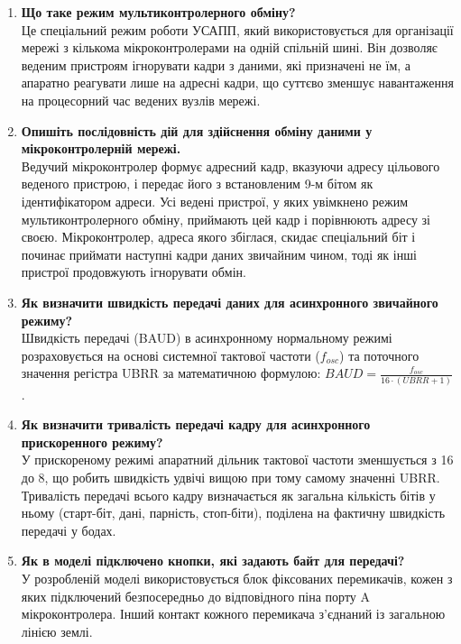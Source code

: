 \documentclass[14pt, a4paper]{extreport}
\begin{document}
\begin{enumerate}
		\item \textbf{Що таке режим мультиконтролерного обміну?} \\ Це спеціальний режим роботи УСАПП, який використовується для організації мережі з кількома мікроконтролерами на одній спільній шині. Він дозволяє веденим пристроям ігнорувати кадри з даними, які призначені не їм, а апаратно реагувати лише на адресні кадри, що суттєво зменшує навантаження на процесорний час ведених вузлів мережі.
		
		\item \textbf{Опишіть послідовність дій для здійснення обміну даними у мікроконтролерній мережі.} \\ Ведучий мікроконтролер формує адресний кадр, вказуючи адресу цільового веденого пристрою, і передає його з встановленим 9-м бітом як ідентифікатором адреси. Усі ведені пристрої, у яких увімкнено режим мультиконтролерного обміну, приймають цей кадр і порівнюють адресу зі своєю. Мікроконтролер, адреса якого збіглася, скидає спеціальний біт і починає приймати наступні кадри даних звичайним чином, тоді як інші пристрої продовжують ігнорувати обмін.
		
		\item \textbf{Як визначити швидкість передачі даних для асинхронного звичайного режиму?} \\ Швидкість передачі (BAUD) в асинхронному нормальному режимі розраховується на основі системної тактової частоти ($f_{osc}$) та поточного значення регістра UBRR за математичною формулою: $BAUD = \frac{f_{osc}}{16 \cdot (UBRR + 1)}$.
		
		\item \textbf{Як визначити тривалість передачі кадру для асинхронного прискоренного режиму?} \\ У прискореному режимі апаратний дільник тактової частоти зменшується з 16 до 8, що робить швидкість удвічі вищою при тому самому значенні UBRR. Тривалість передачі всього кадру визначається як загальна кількість бітів у ньому (старт-біт, дані, парність, стоп-біти), поділена на фактичну швидкість передачі у бодах.
		
		\item \textbf{Як в моделі підключено кнопки, які задають байт для передачі?} \\ У розробленій моделі використовується блок фіксованих перемикачів, кожен з яких підключений безпосередньо до відповідного піна порту A мікроконтролера. Інший контакт кожного перемикача з'єднаний із загальною лінією землі.
		

\end{enumerate}
\end{document}
